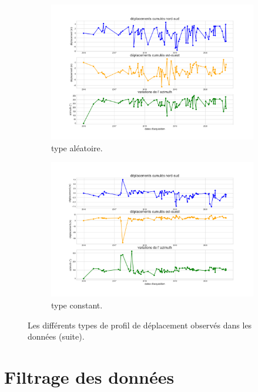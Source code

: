 \documentclass[11pt, openany]{report}
\begin{document}
\begin{figure}[!h]
  \begin{subfigure}[b]{0.5\textwidth}
    \includegraphics[width=\textwidth]{random.png}
    \caption{type aléatoire.}
    \label{fig:f1}
  \end{subfigure}
  \hfill
  \begin{subfigure}[b]{0.5\textwidth}
    \includegraphics[width=\textwidth]{constant.png}
    \caption{type constant.}
    \label{fig:f2}
  \end{subfigure}
  \caption{Les différents types de profil de déplacement observés dans les données (suite).}
\end{figure}

\newpage
\section{Filtrage des données}
\end{document}
